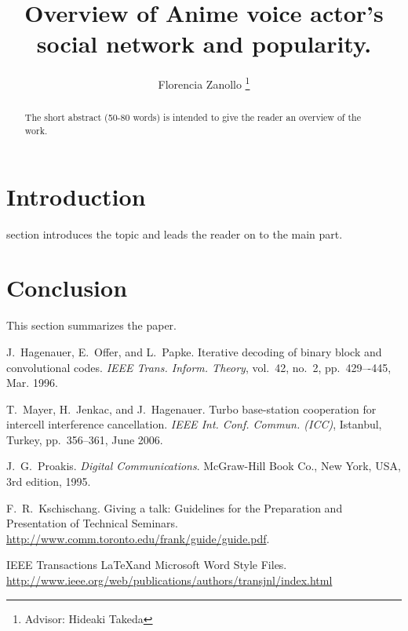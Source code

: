 \documentclass[journal, a4paper]{IEEEtran}
\begin{document}
	\title{Overview of Anime voice actor's social network and popularity.}
	\author{Florencia Zanollo
	\thanks{Advisor: Hideaki Takeda}}
	\maketitle

\begin{abstract}
	The short abstract (50-80 words) is intended to give the reader an overview of the work.
\end{abstract}

\section{Introduction}
	 section introduces the topic and leads the reader on to the main part.





\section{Conclusion}
	This section summarizes the paper.

\begin{thebibliography}{5}
	J.~Hagenauer, E.~Offer, and L.~Papke. Iterative decoding of binary block
	and convolutional codes. {\em IEEE Trans. Inform. Theory},
	vol.~42, no.~2, pp.~429–-445, Mar. 1996.

	T.~Mayer, H.~Jenkac, and J.~Hagenauer. Turbo base-station cooperation for intercell interference cancellation. {\em IEEE Int. Conf. Commun. (ICC)}, Istanbul, Turkey, pp.~356--361, June 2006.

	J.~G.~Proakis. {\em Digital Communications}. McGraw-Hill Book Co.,
	New York, USA, 3rd edition, 1995.

	F.~R.~Kschischang. Giving a talk: Guidelines for the Preparation and Presentation of Technical Seminars.
	\url{http://www.comm.toronto.edu/frank/guide/guide.pdf}.

	IEEE Transactions \LaTeX and Microsoft Word Style Files.
	\url{http://www.ieee.org/web/publications/authors/transjnl/index.html}
\end{thebibliography}
\end{document}
